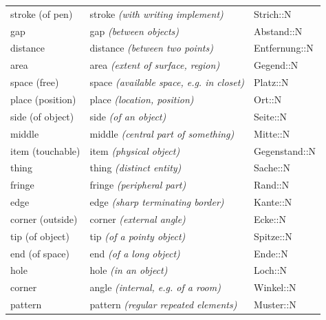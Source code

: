 \begin{center}
\begin{longtable}{lll}
{\sc \lowercase{	STROKE \footnotesize (OF PEN)	}}	&	stroke	\textit{\footnotesize (with writing implement)}	&	Strich::N	\\
{\sc \lowercase{	GAP	}}	&	gap	\textit{\footnotesize (between objects)}	&	Abstand::N	\\
{\sc \lowercase{	DISTANCE	}}	&	distance	\textit{\footnotesize (between two points)}	&	Entfernung::N	\\
{\sc \lowercase{	AREA	}}	&	area	\textit{\footnotesize (extent of surface, region)}	&	Gegend::N	\\
{\sc \lowercase{	SPACE \footnotesize (FREE)	}}	&	space	\textit{\footnotesize (available space, e.g. in closet)}	&	Platz::N	\\
{\sc \lowercase{	PLACE \footnotesize (POSITION)	}}	&	place	\textit{\footnotesize (location, position)}	&	Ort::N	\\
{\sc \lowercase{	SIDE \footnotesize (OF OBJECT)	}}	&	side	\textit{\footnotesize (of an object)}	&	Seite::N	\\
{\sc \lowercase{	MIDDLE	}}	&	middle	\textit{\footnotesize (central part of something)}	&	Mitte::N	\\
{\sc \lowercase{	ITEM \footnotesize (TOUCHABLE)	}}	&	item	\textit{\footnotesize (physical object)}	&	Gegenstand::N	\\
{\sc \lowercase{	THING	}}	&	thing	\textit{\footnotesize (distinct entity)}	&	Sache::N	\\
{\sc \lowercase{	FRINGE	}}	&	fringe	\textit{\footnotesize (peripheral part)}	&	Rand::N	\\
{\sc \lowercase{	EDGE	}}	&	edge	\textit{\footnotesize (sharp terminating border)}	&	Kante::N	\\
{\sc \lowercase{	CORNER \footnotesize (OUTSIDE)	}}	&	corner	\textit{\footnotesize (external angle)}	&	Ecke::N	\\
{\sc \lowercase{	TIP \footnotesize (OF OBJECT)	}}	&	tip	\textit{\footnotesize (of a pointy object)}	&	Spitze::N	\\
{\sc \lowercase{	END \footnotesize (OF SPACE)	}}	&	end	\textit{\footnotesize (of a long object)}	&	Ende::N	\\
{\sc \lowercase{	HOLE	}}	&	hole	\textit{\footnotesize (in an object)}	&	Loch::N	\\
{\sc \lowercase{	CORNER	}}	&	angle	\textit{\footnotesize (internal, e.g. of a room)}	&	Winkel::N	\\
{\sc \lowercase{	PATTERN	}}	&	pattern	\textit{\footnotesize (regular repeated elements)}	&	Muster::N	\\

\end{longtable}
\end{center}
